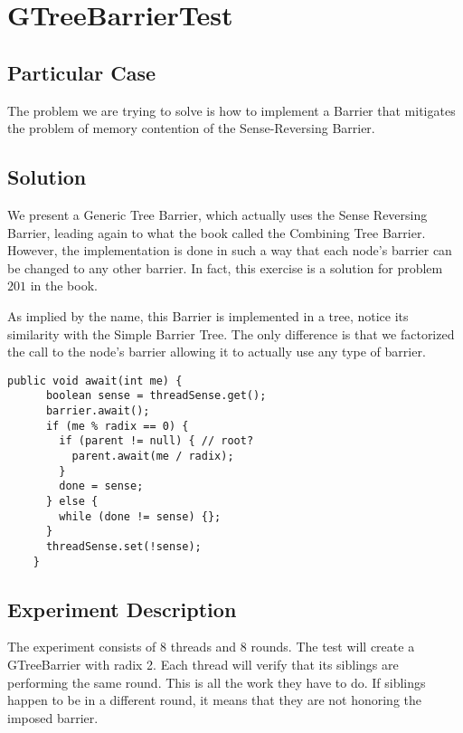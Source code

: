 \section{\textbf{GTreeBarrierTest}}
\subsection{Particular Case}
\par
The problem we are trying to solve is how to implement a Barrier that mitigates
the problem of memory contention of the Sense-Reversing Barrier.
\par
\subsection{Solution}
\par
We present a Generic Tree Barrier, which actually uses the Sense Reversing
Barrier, leading again to what the book called the Combining Tree Barrier.
However, the implementation is done in such a way that each node's barrier can
be changed to any other barrier. In fact, this exercise is a solution for
problem $201$ in the book.
\par
As implied by the name, this Barrier is implemented in a tree, notice its
similarity with the Simple Barrier Tree. The only difference is that we
factorized the call to the node's barrier allowing it to actually use any type
of barrier.
\par
\hfill
\begin{lstlisting}[style=numbers]
    public void await(int me) {
      boolean sense = threadSense.get();
      barrier.await();
      if (me % radix == 0) {
        if (parent != null) { // root?
          parent.await(me / radix);
        }
        done = sense;
      } else {
        while (done != sense) {};
      }
      threadSense.set(!sense);
    }
\end{lstlisting}
\hfill
\par
\subsection{Experiment Description}
\par
The experiment consists of 8 threads and 8 rounds. The test will create a
GTreeBarrier with radix 2. Each thread will verify that its siblings are
performing the same round. This is all the work they have to do. If siblings
happen to be in a different round, it means that they are not honoring  the
imposed barrier.
\par
